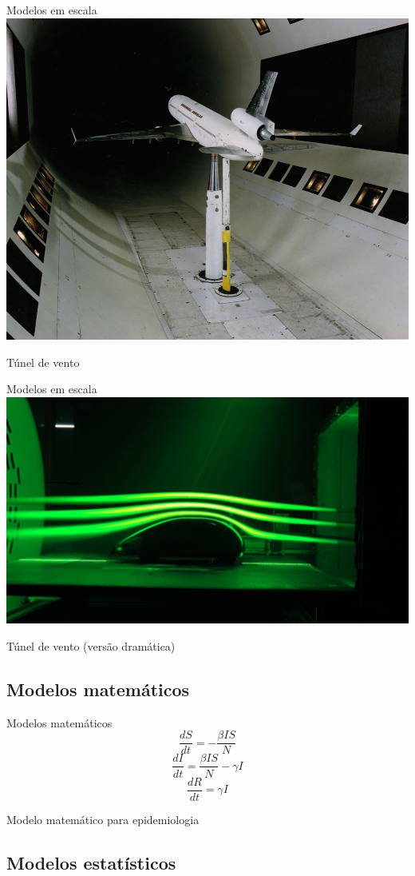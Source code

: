 \documentclass{beamer}
\begin{document}
\begin{frame}{Modelos em escala}
  \centering
  \includegraphics[width=.8\textwidth]{modelos/MD-11_12ft_Wind_Tunnel_Test}

Túnel de vento
\end{frame}

\begin{frame}{Modelos em escala}
  \centering
  \includegraphics[width=\textwidth]{modelos/wind_tunel}

Túnel de vento (versão dramática)
\end{frame}

\subsection{Modelos matemáticos}

\begin{frame}{Modelos matemáticos}
  \centering
  \begin{displaymath}
    \frac{dS}{dt} = -\frac{\beta I S}{N}
  \end{displaymath}
  \begin{displaymath}
    \frac{dI}{dt} = \frac{\beta I S}{N} - \gamma I
  \end{displaymath}
  \begin{displaymath}
    \frac{dR}{dt} = \gamma I
  \end{displaymath}

\bigskip
Modelo matemático para epidemiologia
\end{frame}

\subsection{Modelos estatísticos}
\end{document}
